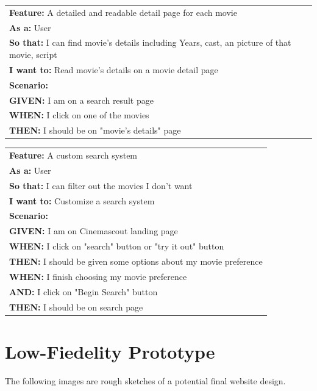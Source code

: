 \documentclass{article}
\begin{document}
\begin{table}[H]
\begin{tabular}{|l|}
\hline
\textbf{Feature:} A detailed and readable detail page for each movie\\
\textbf{As a:} User\\
\textbf{So that:} I can find movie's details including Years, cast, an picture of that movie, script\\
\textbf{I want to:} Read movie's details on a movie detail page\\
\textbf{Scenario:} \\
\textbf{GIVEN:} I am on a search result page\\
\textbf{WHEN:} I click on one of the movies\\
\textbf{THEN:} I should be on "movie's details" page\\
\hline
\end{tabular}
\end{table}

\begin{table}[H]
\begin{tabular}{|l|}
\hline
\textbf{Feature:} A custom search system\\
\textbf{As a:} User\\
\textbf{So that:} I can filter out the movies I don't want\\
\textbf{I want to:} Customize a search system\\
\textbf{Scenario:} \\
\textbf{GIVEN:} I am on Cinemascout landing page\\
\textbf{WHEN:} I click on "search" button or "try it out" button\\
\textbf{THEN:} I should be given some options about my movie preference\\
\textbf{WHEN:} I finish choosing my movie preference\\
\textbf{AND:} I click on "Begin Search" button\\
\textbf{THEN:} I should be on search page\\
\hline
\end{tabular}
\end{table}

\section{Low-Fiedelity Prototype}
The following images are rough sketches of a potential final website design.
\end{document}

